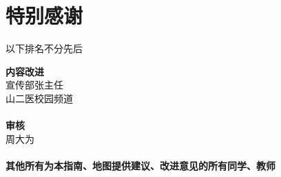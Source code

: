 \chapter*{特别感谢}
 {\centering 以下排名不分先后\\}
\noindent\begin{table*}[!htbp]
    \centering
    {\large \textbf{内容改进}\\
        宣传部张主任\\
        山二医校园频道\\
        \hspace*{\fill} \\
        \textbf{审核}\\
        周大为\\
        \hspace*{\fill} \\
        \textbf{其他所有为本指南、地图提供建议、改进意见的所有同学、教师}}
\end{table*}